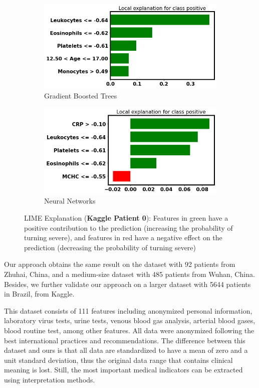 \begin{figure}
\begin{subfigure}[b]{0.45\textwidth}
    \centering
    \includegraphics[width=\textwidth]{figures/chapter_interp/lime_kaggle_xgbc.png}
    \caption{Gradient Boosted Trees}
    \label{fig:lime_kaggle_xgbc}
\end{subfigure}
\hfill
\begin{subfigure}[b]{0.45\textwidth}
    \centering
    \includegraphics[width=\textwidth]{figures/chapter_interp/lime_kaggle_nn.png}
    \caption{Neural Networks}
    \label{fig:lime_kaggle_nn}
\end{subfigure}
\hfill
\label{fig:kaggle_lime}
\caption{LIME Explanation (\textbf{Kaggle Patient 0}): Features in green have a positive contribution to the prediction (increasing the probability of turning severe), and features in red have a negative effect on the prediction (decreasing the probability of turning severe)}
\end{figure}

Our approach obtains the same result on the dataset with 92 patients from Zhuhai, China, and a medium-size dataset with 485 patients from Wuhan, China. Besides, we further validate our approach on a larger dataset with 5644 patients in Brazil, from Kaggle.

This dataset consists of 111 features including anonymized personal information, laboratory virus tests, urine tests, venous blood gas analysis, arterial blood gases, blood routine test, among other features. All data were anonymized following the best international practices and recommendations. The difference between this dataset and ours is that all data are standardized to have a mean of zero and a unit standard deviation, thus the original data range that contains clinical meaning is lost. Still, the most important medical indicators can be extracted using interpretation methods.

